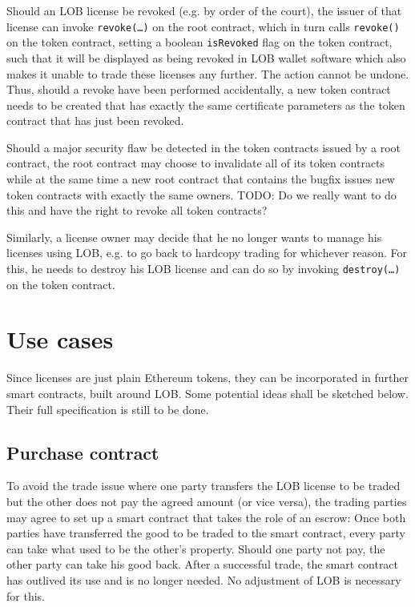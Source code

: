 \documentclass[a4paper]{article}
\newcommand{\todo}[1]{\textsf{TODO: #1}}
\begin{document}
Should an LOB license be revoked (e.g. by order of the court), the issuer of that license can invoke \texttt{revoke(…)} on the root contract, which in turn calls \texttt{revoke()} on the token contract, setting a boolean \texttt{isRevoked} flag on the token contract, such that it will be displayed as being revoked in LOB wallet software which also makes it unable to trade these licenses any further. The action cannot be undone. Thus, should a revoke have been performed accidentally, a new token contract needs to be created that has exactly the same certificate parameters as the token contract that has just been revoked.

Should a major security flaw be detected in the token contracts issued by a root contract, the root contract may choose to invalidate all of its token contracts while at the same time a new root contract that contains the bugfix issues new token contracts with exactly the same owners. \todo{Do we really want to do this and have the right to revoke all token contracts?}

Similarly, a license owner may decide that he no longer wants to manage his licenses using LOB, e.g. to go back to hardcopy trading for whichever reason. For this, he needs to destroy his LOB license and can do so by invoking \texttt{destroy(…)} on the token contract.

\section{Use cases}
\label{ch:useCases}

Since licenses are just plain Ethereum tokens, they can be incorporated in further smart contracts, built around LOB. Some potential ideas shall be sketched below. Their full specification is still to be done.

\subsection{Purchase contract}
\label{ch:purchaseContract}

To avoid the trade issue where one party transfers the LOB license to be traded but the other does not pay the agreed amount (or vice versa), the trading parties may agree to set up a smart contract that takes the role of an escrow: Once both parties have transferred the good to be traded to the smart contract, every party can take what used to be the other's property. Should one party not pay, the other party can take his good back. After a successful trade, the smart contract has outlived its use and is no longer needed. No adjustment of LOB is necessary for this.
\end{document}
